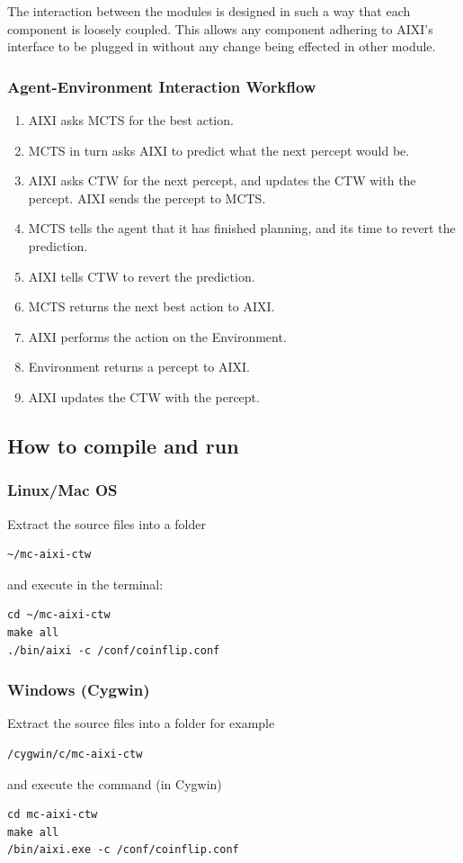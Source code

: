 \documentclass{article}
\theoremstyle{definition}
\newtheorem{primary statistics}[definition]{Primary Statistics}
\newtheorem{auxiliary statistics}[definition]{Auxiliary Statistics}
\begin{document}
The interaction between the modules is designed in such a way that each component is loosely coupled. This allows any component adhering to AIXI's interface to be plugged in without any change being effected in other module.

\subsubsection*{Agent-Environment Interaction Workflow}
\begin{enumerate}
    \item AIXI asks MCTS for the best action.
    \item MCTS in turn asks AIXI to predict what the next percept would be.
    \item AIXI asks CTW for the next percept, and updates the CTW with the percept. AIXI sends the percept to MCTS.
    \item MCTS tells the agent that it has finished planning, and its time to revert the prediction.
    \item AIXI tells CTW to revert the prediction.
    \item MCTS returns the next best action to AIXI.
    \item AIXI performs the action on the Environment.
    \item Environment returns a percept to AIXI.
    \item AIXI updates the CTW with the percept.
\end{enumerate}


\subsection{How to compile and run}
\subsubsection*{Linux/Mac OS}
Extract the source files into a folder 
\begin{lstlisting}[style=DOS]
 ~/mc-aixi-ctw 
\end{lstlisting}
 and execute in the terminal:
 
\begin{lstlisting}[style=DOS]
cd ~/mc-aixi-ctw
make all
./bin/aixi -c /conf/coinflip.conf
\end{lstlisting}

\subsubsection*{Windows (Cygwin)}
Extract the source files into a folder for example
\begin{lstlisting}[style=DOS]
 /cygwin/c/mc-aixi-ctw 
\end{lstlisting}
and execute the command (in Cygwin)
\begin{lstlisting}[style=DOS]
cd mc-aixi-ctw
make all
/bin/aixi.exe -c /conf/coinflip.conf
\end{lstlisting} 
\end{document}
